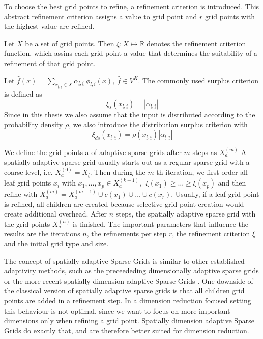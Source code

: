 \documentclass[
  a4paper,  %
  twoside,  %
  bibliography=totoc,
  headsepline,
  cleardoublepage=empty,
  parskip=half,
  draft=false
]{scrbook}
\begin{document}
To choose the best grid points to refine, a refinement criterion is introduced.
This abstract refinement criterion assigns a value to grid point and $r$ grid points with the highest value are refined.

\begin{definition}
Let $X$ be a set of grid points.
Then $\xi \colon X \mapsto \mathds{R}$ denotes the refinement criterion function, which assins each grid point a value that determines the suitability of a refinement of that grid point.

Let $\hat{f}(x) = \sum_{x_{\underline{l},\underline{i}} \in X} \alpha_{\underline{l},\underline{i}} ~ \phi_{
\underline{l},\underline{i}}(x), ~\hat{f} \in V^X$.
The commonly used surplus criterion is defined as
\begin{equation}
\xi_s(x_{\underline{l},\underline{i}}) = |\alpha_{\underline{l},\underline{i}}|
\end{equation}
Since in this thesis we also assume that the input is distributed according to the probability density $\rho$, we also introduce the distribution surplus criterion with
\begin{equation}
\xi_{ds}(x_{\underline{l},\underline{i}}) =\rho(x_{\underline{l},\underline{i}}) |\alpha_{\underline{l},\underline{i}}|
\end{equation}
\end{definition}
We define the grid points a of adaptive sparse grids after $m$ steps as $X_a^{(m)}$
A spatially adaptive sparse grid usually starts out as a regular sparse grid with a coarse level, i.e. $X_a^{(0)}=X_{\underline{l}}$.
Then during the $m$-th iteration, we first order all leaf grid points $x_i$ with $x_1, \dots, x_p \in X_a^{(k-1)}, ~~ \xi(x_1) \geq \dots \geq \xi(x_p)$ and then refine with $X_a^{(m)}=X_a^{(m-1)} \cup c(x_1) \cup \dots \cup c(x_r)$.
Usually, if a leaf grid point is refined, all children are created because selective grid point creation would create additional overhead.
After $n$ steps, the spatially adaptive sparse grid with the grid points $X_a^{(n)}$ is finished.
The important parameters that influence the results are the iterations $n$, the refinements per step $r$, the refinement criterion $\xi$ and the initial grid type and size.

The concept of spatially adaptive Sparse Grids is similar to other established adaptivity methods, such as the preceededing dimensionally adaptive sparse grids \cite{} or the more recent spatially dimension adaptive Sparse Grids \cite{}.
One downside of the classical version of spatially adaptive sparse grids is that all children grid points are added in a refinement step.
In a dimension reduction focused setting this behaviour is not optimal, since we want to focus on more important dimensions only when refining a grid point.
Spatially dimension adaptive Sparse Grids do exactly that, and are therefore better suited for dimension reduction.
\end{document}
